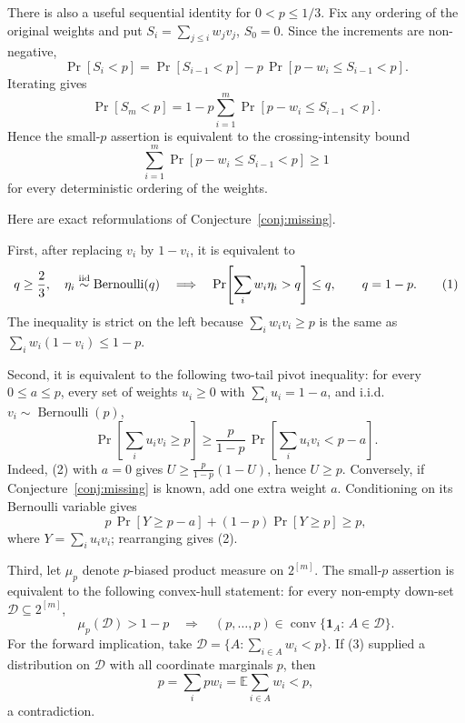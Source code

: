 \documentclass[12pt]{article}
\newcommand{\Ber}{\operatorname{Bernoulli}}
\newcommand{\conv}{\operatorname{conv}}
\begin{document}
There is also a useful sequential identity for \(0<p\le1/3\).  Fix any ordering
of the original weights and put \(S_i=\sum_{j\le i}w_jv_j\), \(S_0=0\).  Since
the increments are non-negative,
\[
 \Pr[S_i<p]=\Pr[S_{i-1}<p]
      -p\,\Pr[p-w_i\le S_{i-1}<p].
\]
Iterating gives
\[
 \Pr[S_m<p]
   =1-p\sum_{i=1}^m\Pr[p-w_i\le S_{i-1}<p].              \tag{10}
\]
Hence the small-\(p\) assertion is equivalent to the crossing-intensity bound
\[
        \sum_{i=1}^m\Pr[p-w_i\le S_{i-1}<p]\ge1
\]
for every deterministic ordering of the weights.

Here are exact reformulations of Conjecture~\ref{conj:missing}.

First, after replacing \(v_i\) by \(1-v_i\), it is equivalent to
\[
   q\ge\frac23,\quad \eta_i\stackrel{\rm iid}{\sim}\Ber(q)
   \quad\Longrightarrow\quad
   \Pr\!\left[\sum_i w_i\eta_i>q\right]\le q ,
   \qquad q=1-p .                                      \tag{1}
\]
The inequality is strict on the left because
\(\sum_i w_i v_i\ge p\) is the same as
\(\sum_iw_i(1-v_i)\le1-p\).

Second, it is equivalent to the following two-tail pivot inequality: for every
\(0\le a\le p\), every set of weights \(u_i\ge0\) with
\(\sum_i u_i=1-a\), and i.i.d.\ \(v_i\sim\Ber(p)\),
\[
   \Pr\!\left[\sum_i u_i v_i\ge p\right]
   \ge
   \frac{p}{1-p}\,
   \Pr\!\left[\sum_i u_i v_i<p-a\right].                 \tag{2}
\]
Indeed, (2) with \(a=0\) gives
\(U\ge\frac{p}{1-p}(1-U)\), hence \(U\ge p\).  Conversely, if
Conjecture~\ref{conj:missing} is known, add one extra weight \(a\).  Conditioning on
its Bernoulli variable gives
\[
 p\,\Pr[Y\ge p-a]+(1-p)\Pr[Y\ge p]\ge p,
\]
where \(Y=\sum_i u_i v_i\); rearranging gives (2).

Third, let \(\mu_p\) denote \(p\)-biased product measure on \(2^{[m]}\).  The
small-\(p\) assertion is equivalent to the following convex-hull statement: for
every non-empty down-set \(\mathcal D\subseteq 2^{[m]}\),
\[
       \mu_p(\mathcal D)>1-p
       \quad\Longrightarrow\quad
       (p,\ldots,p)\in
       \conv\{\mathbf 1_A:\,A\in\mathcal D\}.             \tag{3}
\]
For the forward implication, take
\(\mathcal D=\{A:\sum_{i\in A}w_i<p\}\).  If (3) supplied a distribution on
\(\mathcal D\) with all coordinate marginals \(p\), then
\[
 p=\sum_i p w_i
   =\mathbb E\sum_{i\in A}w_i
   <p,
\]
a contradiction.
\end{document}
